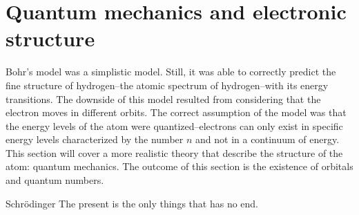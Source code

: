 \documentclass[main.tex]{subfiles}
\begin{document}
\section{Quantum mechanics and electronic structure}
Bohr's model was a simplistic model. Still, it was able to correctly predict the fine structure of hydrogen--the atomic spectrum of hydrogen--with its energy transitions. The downside of this model resulted from considering that the electron moves in different orbits. The correct assumption of the model was that the energy levels of the atom were quantized--electrons can only exist in specific energy levels characterized by the number $n$ and not in a continuum of energy. This section will cover a more realistic theory that describe the structure of the atom: quantum mechanics. The outcome of this section is the existence of orbitals and quantum numbers.
\begin{marginfigure}
    \begin{shadequote}[l]{Schr\"{o}dinger}
The present is the only things that has no end.\end{shadequote}   
\end{marginfigure}
\sloppy
\end{document}
